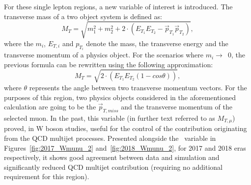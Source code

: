 \hspace{10pt} For these single lepton regions, a new variable of interest is introduced. The transverse mass of a two object system is defined as:
\begin{equation}
    M_T= \sqrt{m_1^2+m_2^2+2\cdot(E_{T_1}E_{T_2}-\vec{p}_{T_1}\vec{p}_{T_2})},
\end{equation}
where the $m_i$, $E_{T,i}$ and $p_{T_i}$ denote the mass, the transverse energy and the transverse momentum of a physics object. For the scenarios where $m_i\rightarrow$~0, the previous formula can be rewritten using the following approximation:
\begin{equation}
    M_T= \sqrt{2\cdot(E_{T_1}E_{T_2}(1-cos\theta))},
\end{equation}
where $\theta$ represents the angle between two transverse momentum vectors. For the purposes of this region, two physics objects considered in the aforementioned calculation are going to be the $\vec{p}_{T, miss}$ and the transverse momentum of the selected muon. In the past, this variable (in further text referred to as $M_{T, \mu}$) proved, in W boson studies, useful for the control of the contribution originating from the QCD multijet processes. Presented alongside the \mindphinomu~variable in Figures~\ref{fig:2017_Wmunu_2} and~\ref{fig:2018_Wmunu_2}, for 2017 and 2018 eras respectively, it shows good agreement between data and simulation and significantly reduced QCD multijet contribution (requiring no additional requirement for this region).





